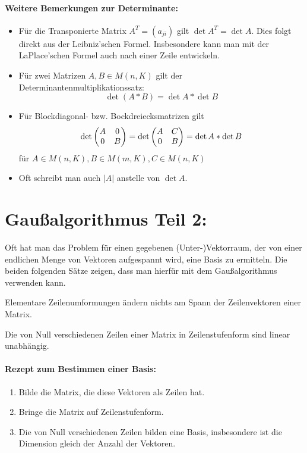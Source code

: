 \paragraph{Weitere Bemerkungen zur Determinante:}
\begin{itemize}
	\item Für die Transponierte Matrix $A^T=(a_{ji})$ gilt $\det A^T=\det A$.
	Dies folgt direkt aus der Leibniz'schen Formel. Insbesondere kann man mit der LaPlace'schen Formel auch nach einer Zeile entwickeln.
	\item Für zwei Matrizen $A,B\in M(n,K)$ gilt der Determinantenmultiplikationssatz:
	\begin{equation*}
		\det(A*B)=\det A*\det B
	\end{equation*}
	\item Für Blockdiagonal- bzw. Bockdreiecksmatrizen gilt
	\begin{equation*}
		\det\matrix{A&0\\0&B}=\det\matrix{A&C\\0&B}=\det A*\det B
	\end{equation*}
	für $A\in M(n,K), B\in M(m,K), C\in M(n,K)$
	\item Oft schreibt man auch $|A|$ anstelle von $\det A$.
\end{itemize}

\section{Gaußalgorithmus Teil 2:}
Oft hat man das Problem für einen gegebenen (Unter-)Vektorraum, der von einer endlichen Menge von Vektoren aufgespannt wird, eine Basis zu ermitteln. Die beiden folgenden Sätze zeigen, dass man hierfür mit dem Gaußalgorithmus verwenden kann.

\begin{satz}{}
	Elementare Zeilenumformungen ändern nichts am Spann der Zeilenvektoren einer Matrix.
\end{satz}
\begin{satz}{}
	Die von Null verschiedenen Zeilen einer Matrix in Zeilenstufenform sind linear unabhängig.
\end{satz}

\paragraph{Rezept zum Bestimmen einer Basis:}
\begin{enumerate}
	\item Bilde die Matrix, die diese Vektoren als Zeilen hat.
	\item Bringe die Matrix auf Zeilenstufenform.
	\item Die von Null verschiedenen Zeilen bilden eine Basis, insbesondere ist die Dimension gleich der Anzahl der Vektoren.
\end{enumerate}
